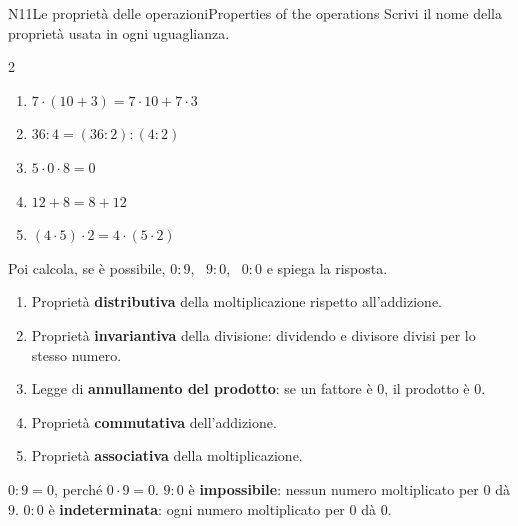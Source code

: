 

\begin{esercizio}{N1}{1}{Le proprietà delle operazioni}{Properties of the operations}
Scrivi il nome della proprietà usata in ogni uguaglianza.
\begin{multicols}{2}
\begin{enumerate}
\item $7\cdot(10+3)=7\cdot10+7\cdot3$
\item $36:4=(36:2):(4:2)$
\item $5\cdot 0\cdot 8=0$
\item $12+8=8+12$
\item $(4\cdot 5)\cdot 2=4\cdot(5\cdot 2)$
\end{enumerate}
\end{multicols}
\vspace{-4pt}
Poi calcola, se è possibile, $0:9$, \ $9:0$, \ $0:0$ e spiega la risposta.
\end{esercizio}
\begin{solbox}
\begin{enumerate}
\item Proprietà \textbf{distributiva} della moltiplicazione rispetto all'addizione. 
\item Proprietà \textbf{invariantiva} della divisione: dividendo e divisore divisi per lo stesso numero. 
\item Legge di \textbf{annullamento del prodotto}: se un fattore è $0$, il prodotto è $0$. 
\item Proprietà \textbf{commutativa} dell'addizione. 
\item Proprietà \textbf{associativa} della moltiplicazione. 
\end{enumerate}
$0:9=0$, perché $0\cdot 9=0$.\quad
$9:0$ è \textbf{impossibile}: nessun numero moltiplicato per $0$ dà $9$.\quad
$0:0$ è \textbf{indeterminata}: ogni numero moltiplicato per $0$ dà $0$.
\end{solbox}


